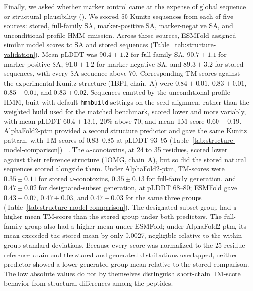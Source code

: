 Finally, we asked whether marker control came at the expense of global sequence or structural
plausibility (). We scored 50 Kunitz sequences from each of
five sources: stored, full-family SA, marker-positive SA, marker-negative SA, and unconditional
profile-HMM emission. Across those sources, ESMFold assigned similar model scores to SA and
stored sequences (Table~\ref{tab:structure-validation}). Mean pLDDT was $90.4\pm1.2$ for
full-family SA, $90.7\pm1.1$ for marker-positive SA, $91.0\pm1.2$ for marker-negative SA, and
$89.3\pm3.2$ for stored sequences, with every SA sequence above 70. Corresponding TM-scores
against the experimental Kunitz structure (1BPI, chain~A) were $0.84\pm0.01$, $0.83\pm0.01$,
$0.85\pm0.01$, and $0.83\pm0.02$. Sequences emitted by the unconditional profile HMM, built with
default \texttt{hmmbuild} settings on the seed alignment rather than the weighted build used for
the matched benchmark, scored lower and more variably, with mean pLDDT $60.4\pm13.1$, 20\% above
70, and mean TM-score $0.60\pm0.19$. AlphaFold2-ptm provided a second structure predictor and
gave the same Kunitz pattern, with TM-scores of
0.83--0.85 at pLDDT 93--95 (Table~\ref{tab:structure-model-comparison})
~\cite{jumperHighlyAccurate2021,mirdita2022colabfold}. The $\omega$-conotoxins, at 24 to 35
residues, scored lower against their reference structure (1OMG, chain~A), but so did the stored
natural sequences scored alongside them. Under AlphaFold2-ptm, TM-scores were $0.35\pm0.11$ for stored
$\omega$-conotoxins, $0.35\pm0.13$ for full-family generation, and $0.47\pm0.02$ for
designated-subset generation, at pLDDT 68--80; ESMFold gave $0.43\pm0.07$, $0.47\pm0.03$, and
$0.47\pm0.03$ for the same three groups (Table~\ref{tab:structure-model-comparison}). The
designated-subset group had a higher mean TM-score than the stored group under both predictors.
The full-family group also had a higher mean under ESMFold; under AlphaFold2-ptm, its mean exceeded
the stored mean by only 0.0027, negligible relative to the within-group standard deviations.
Because every score was normalized to the 25-residue reference chain and the stored and generated
distributions overlapped, neither predictor showed a lower generated-group mean relative to the
stored comparison.
The low absolute values do not by themselves distinguish short-chain TM-score behavior from
structural differences among the peptides.

